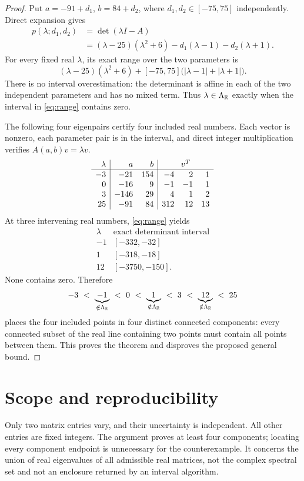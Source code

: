 \begin{proof}
Put $a=-91+d_1$, $b=84+d_2$, where $d_1,d_2\in[-75,75]$ independently. Direct expansion gives
\begin{align*}
 p(\lambda;d_1,d_2)
 &=\det(\lambda I-A)\\
 &=(\lambda-25)(\lambda^2+6)-d_1(\lambda-1)-d_2(\lambda+1).
\end{align*}
For every fixed real $\lambda$, its exact range over the two parameters is
\begin{equation}\label{eq:range}
 (\lambda-25)(\lambda^2+6)
 +[-75,75]\bigl(|\lambda-1|+|\lambda+1|\bigr).
\end{equation}
There is no interval overestimation: the determinant is affine in each of the two independent parameters and has no mixed term. Thus $\lambda\in\Lambda_{\mathbb R}$ exactly when the interval in \eqref{eq:range} contains zero.

The following four eigenpairs certify four included real numbers. Each vector is nonzero, each parameter pair is in the interval, and direct integer multiplication verifies $A(a,b)v=\lambda v$.
\[
\begin{array}{r|r r|r r r}
 \lambda&a&b&\multicolumn{3}{c}{v^T}\\\hline
 -3&-21&154&-4&2&1\\
 0&-16&9&-1&-1&1\\
 3&-146&29&4&1&2\\
 25&-91&84&312&12&13
\end{array}
\]
At three intervening real numbers, \eqref{eq:range} yields
\[
\begin{array}{r|r}
 \lambda&\text{exact determinant interval}\\\hline
 -1&[-332,-32]\\
 1&[-318,-18]\\
 12&[-3750,-150].
\end{array}
\]
None contains zero. Therefore
\[
 -3\ <\ \underbrace{-1}_{\notin\Lambda_{\R}}\ <\ 0\ <\
 \underbrace{1}_{\notin\Lambda_{\R}}\ <\ 3\ <\
 \underbrace{12}_{\notin\Lambda_{\R}}\ <\ 25
\]
places the four included points in four distinct connected components: every connected subset of the real line containing two points must contain all points between them. This proves the theorem and disproves the proposed general bound.
\end{proof}
\section{Scope and reproducibility}
Only two matrix entries vary, and their uncertainty is independent. All other entries are fixed integers. The argument proves at least four components; locating every component endpoint is unnecessary for the counterexample. It concerns the union of real eigenvalues of all admissible real matrices, not the complex spectral set and not an enclosure returned by an interval algorithm.

